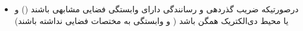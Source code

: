 \begin{ELjoin}

\begin{itemize}
\tightlist
\item
  درصورتیکه ضریب گذردهی و رسانندگی دارای وابستگی فضایی مشابهی باشند () و یا محیط دی‌الکتریک همگن باشد (\ELim{\epsilon} و \ELim{\sigma} وابستگی به مختصات فضایی نداشته باشند)
\end{itemize}

\begin{ELimportant}{}


\end{ELimportant}

\end{ELjoin}


